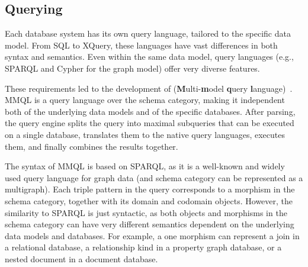 \subsection{Querying}

Each database system has its own query language, tailored to the specific data model. From SQL to XQuery, these languages have vast differences in both syntax and semantics. Even within the same data model, query languages (e.g., SPARQL and Cypher for the graph model) offer very diverse features.




These requirements led to the development of  (\textbf{M}ulti-\textbf{m}odel \textbf{q}uery \textbf{l}anguage)~\citep{mm_quecat, koupil2023universal}. MMQL is a query language over the schema category, making it independent both of the underlying data models and of the specific databases. After parsing, the query engine splits the query into maximal subqueries that can be executed on a single database, translates them to the native query languages, executes them, and finally combines the results together.

The syntax of MMQL is based on SPARQL, as it is a well-known and widely used query language for graph data (and schema category can be represented as a multigraph). Each triple pattern in the query corresponds to a morphism in the schema category, together with its domain and codomain objects. However, the similarity to SPARQL is just syntactic, as both objects and morphisms in the schema category can have very different semantics dependent on the underlying data models and databases. For example, a one morphism can represent a join in a relational database, a relationship kind in a property graph database, or a nested document in a document database.

